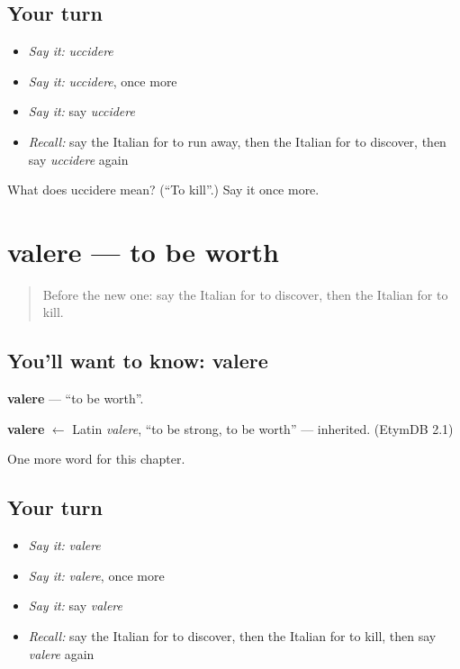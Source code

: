 \subsection*{Your turn}
\begin{itemize}
\raggedright
  \item \emph{Say it:} \emph{uccidere}
  \item \emph{Say it:} \emph{uccidere}, once more
  \item \emph{Say it:} say \emph{uccidere}
  \item \emph{Recall:} say the Italian for to run away, then the Italian for to discover, then say \emph{uccidere} again
\end{itemize}

\begin{tcolorbox}[breakable,colback=teal!4,colframe=teal!35!black,title={Before you move on}]
What does uccidere mean? (\textquotedblleft{}To kill\textquotedblright{}.) Say it once more.
\end{tcolorbox}
\section[valere]{valere — to be worth}

\label{lesson:IT-C182-valere}



\begin{quote}
Before the new one: say the Italian for to discover, then the Italian for to kill.
\end{quote}

\subsection*{You'll want to know: valere}
\textbf{valere} — \textquotedblleft{}to be worth\textquotedblright{}.

\begin{cousinweb}
\textbf{valere} $\leftarrow$ Latin \emph{valere}, \textquotedblleft{}to be strong, to be worth\textquotedblright{} — inherited. (EtymDB 2.1)
\end{cousinweb}

\begin{grammarlens}[title={What you've built}]
One more word for this chapter.
\end{grammarlens}

\subsection*{Your turn}
\begin{itemize}
\raggedright
  \item \emph{Say it:} \emph{valere}
  \item \emph{Say it:} \emph{valere}, once more
  \item \emph{Say it:} say \emph{valere}
  \item \emph{Recall:} say the Italian for to discover, then the Italian for to kill, then say \emph{valere} again
\end{itemize}

